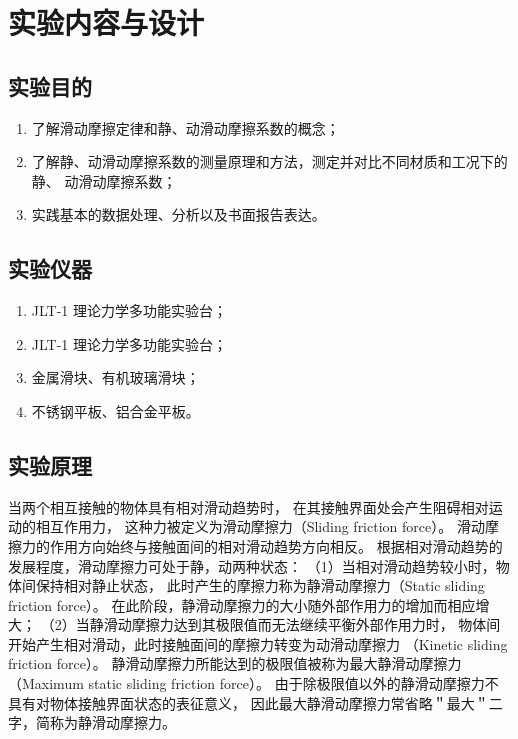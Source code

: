 
\section{实验内容与设计}

\subsection{实验目的}
    \begin{enumerate}
        \item 了解滑动摩擦定律和静、动滑动摩擦系数的概念；
        \item 了解静、动滑动摩擦系数的测量原理和方法，测定并对比不同材质和工况下的静、
        动滑动摩擦系数；
        \item 实践基本的数据处理、分析以及书面报告表达。
    \end{enumerate}

\subsection{实验仪器}

    \begin{enumerate}
        \item JLT-1 理论力学多功能实验台；
        \item JLT-1 理论力学多功能实验台；
        \item 金属滑块、有机玻璃滑块；
        \item 不锈钢平板、铝合金平板。
    \end{enumerate}



\subsection{实验原理}
当两个相互接触的物体具有相对滑动趋势时，
在其接触界面处会产生阻碍相对运动的相互作用力，
这种力被定义为滑动摩擦力（Sliding friction force）。
滑动摩擦力的作用方向始终与接触面间的相对滑动趋势方向相反。
根据相对滑动趋势的发展程度，滑动摩擦力可处于静，动两种状态：
（1）当相对滑动趋势较小时，物体间保持相对静止状态，
此时产生的摩擦力称为静滑动摩擦力（Static sliding friction force）。
在此阶段，静滑动摩擦力的大小随外部作用力的增加而相应增大；
（2）当静滑动摩擦力达到其极限值而无法继续平衡外部作用力时，
物体间开始产生相对滑动，此时接触面间的摩擦力转变为动滑动摩擦力
（Kinetic sliding friction force）。
静滑动摩擦力所能达到的极限值被称为最大静滑动摩擦力
（Maximum static sliding friction force）。
由于除极限值以外的静滑动摩擦力不具有对物体接触界面状态的表征意义，
因此最大静滑动摩擦力常省略＂最大＂二字，简称为静滑动摩擦力。

